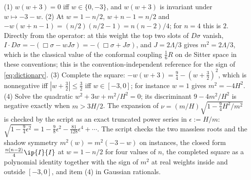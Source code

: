 (1) $w(w+3) = 0$ iff $w \in \{0,-3\}$, and $w(w+3)$ is invariant under $w \mapsto -3-w$. (2) At $w = 1 - n/2$, $w + n - 1 = n/2$ and $-w(w+n-1) = (n/2)(n/2 - 1) = n(n-2)/4$; for $n = 4$ this is $2$. Directly from the operator: at this weight the top two slots of $D\sigma$ vanish, $I \cdot D\sigma = -(\Box\sigma - wJ\sigma) = -(\Box\sigma + J\sigma)$, and $J = 2\Lambda/3$ gives $m^{2} = 2\Lambda/3$, which is the classical value of the conformal coupling $\tfrac16 R$ on de Sitter space in these conventions; this is the convention-independent reference for the sign of \eqref{eq:dictionary}. (3) Complete the square: $-w(w+3) = \tfrac94 - (w+\tfrac32)^{2}$, which is nonnegative iff $|w + \tfrac32| \le \tfrac32$ iff $w \in [-3,0]$; for instance $w = 1$ gives $m^{2} = -4H^{2}$. (4) Solve the quadratic $w^{2} + 3w + m^{2}/H^{2} = 0$; its discriminant $9 - 4m^{2}/H^{2}$ is negative exactly when $m > 3H/2$. The expansion of $\nu = (m/H)\sqrt{1 - \tfrac94 H^{2}/m^{2}}$ is checked by the script as an exact truncated power series in $\epsilon := H/m$: $\sqrt{1 - \tfrac94\epsilon^{2}} = 1 - \tfrac98\epsilon^{2} - \tfrac{81}{128}\epsilon^{4} + \cdots$. The script checks the two massless roots and the shadow symmetry $m^{2}(w) = m^{2}(-3-w)$ on instances, the closed form $\tfrac{n(n-2)}{4}\ip{I}{I}$ at $w = 1 - n/2$ for four values of $n$, the completed square as a polynomial identity together with the sign of $m^{2}$ at real weights inside and outside $[-3,0]$, and item (4) in Gaussian rationals.
